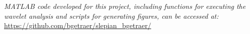 \noindent\textit{MATLAB code developed for this project, including functions for executing the wavelet analysis and scripts for generating figures, can be accessed at:} \\
\indent \url{https://github.com/bgetraer/slepian_bgetraer/}\\




